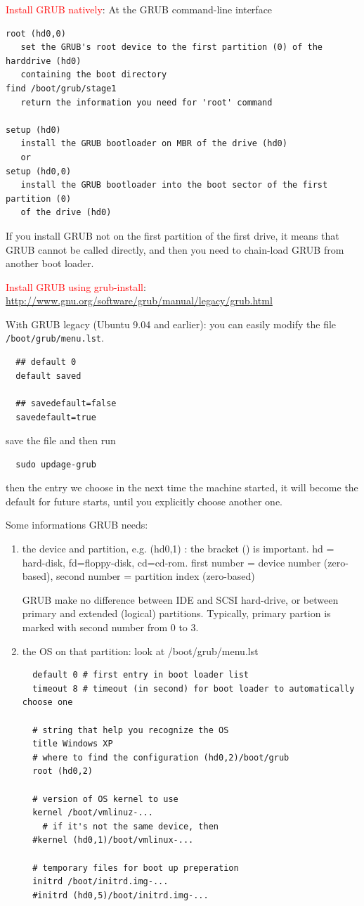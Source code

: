 \textcolor{red}{Install GRUB natively}: At the GRUB command-line interface

\begin{verbatim}
root (hd0,0)
   set the GRUB's root device to the first partition (0) of the harddrive (hd0)
   containing the boot directory
find /boot/grub/stage1
   return the information you need for 'root' command
   
setup (hd0)
   install the GRUB bootloader on MBR of the drive (hd0)
   or
setup (hd0,0)
   install the GRUB bootloader into the boot sector of the first partition (0)
   of the drive (hd0)      
\end{verbatim}
If you install GRUB not on the first partition of the first drive, it means
that GRUB cannot be called directly, and then you need to chain-load GRUB from
another boot loader.

\textcolor{red}{Install GRUB using grub-install}:
\url{http://www.gnu.org/software/grub/manual/legacy/grub.html}

With GRUB legacy (Ubuntu 9.04 and earlier): you can easily modify the file
\verb!/boot/grub/menu.lst!. 

  \begin{verbatim}
  ## default 0
  default saved
  
  ## savedefault=false
  savedefault=true
  \end{verbatim}
  save the file and then run 
  \begin{verbatim}
  sudo updage-grub	
  \end{verbatim}
  then the entry we choose in the next time the machine started, it will become
  the default for future starts, until you explicitly choose another one.

Some informations GRUB needs:
\begin{enumerate}
  \item the device and partition, e.g. (hd0,1) : the bracket () is important. hd
  = hard-disk, fd=floppy-disk, cd=cd-rom. first number = device number (zero-based), second number =
  partition index (zero-based)
  
  GRUB make no difference between IDE and SCSI hard-drive, or between primary
  and extended (logical) partitions. Typically, primary partion is marked with
  second number from 0 to 3.
  
  \item the OS on that partition: look at /boot/grub/menu.lst
  \begin{verbatim}
  default 0 # first entry in boot loader list
  timeout 8 # timeout (in second) for boot loader to automatically choose one
  
  # string that help you recognize the OS
  title Windows XP
  # where to find the configuration (hd0,2)/boot/grub 
  root (hd0,2)
  
  # version of OS kernel to use
  kernel /boot/vmlinuz-...
    # if it's not the same device, then 
  #kernel (hd0,1)/boot/vmlinux-...
  
  # temporary files for boot up preperation
  initrd /boot/initrd.img-...
  #initrd (hd0,5)/boot/initrd.img-...
  \end{verbatim}
\end{enumerate}  

